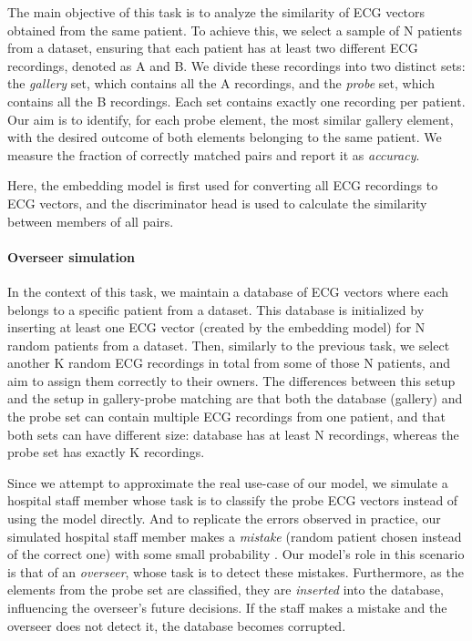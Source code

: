 \documentclass[preprint,12pt]{elsarticle}
\begin{document}
The main objective of this task is to analyze the similarity of ECG vectors obtained from the same patient. To achieve this, we select a sample of N patients from a dataset, ensuring that each patient has at least two different ECG recordings, denoted as A and B. We divide these recordings into two distinct sets: the \textit{gallery} set, which contains all the A recordings, and the \textit{probe} set, which contains all the B recordings. Each set contains exactly one recording per patient. Our aim is to identify, for each probe element, the most similar gallery element, with the desired outcome of both elements belonging to the same patient. We measure the fraction of correctly matched pairs and report it as \textit{accuracy}. 

Here, the embedding model is first used for converting all  ECG recordings to ECG vectors, and the discriminator head  is used to calculate the similarity between members of all  pairs.



\paragraph{Overseer simulation}

In the context of this task, we maintain a database of ECG vectors where each belongs to a specific patient from a dataset. This database is initialized by inserting at least one ECG vector (created by the embedding model) for N random patients from a dataset. Then, similarly to the previous task, we select another K random ECG recordings in total from some of those N patients, and aim to assign them correctly to their owners. The differences between this setup and the setup in gallery-probe matching are that both the database (gallery) and the probe set can contain multiple ECG recordings from one patient, and that both sets can have different size: database has at least N recordings, whereas the probe set has exactly K recordings.

Since we attempt to approximate the real use-case of our model, we simulate a hospital staff member whose task is to classify the probe ECG vectors instead of using the model directly. And to replicate the errors observed in practice, our simulated hospital staff member makes a \textit{mistake} (random patient chosen instead of the correct one) with some small probability . Our model's role in this scenario is that of an \textit{overseer}, whose task is to detect these mistakes. Furthermore, as the elements from the probe set are classified, they are \textit{inserted} into the database, influencing the overseer's future decisions. If the staff makes a mistake and the overseer does not detect it, the database becomes corrupted. 
\end{document}
